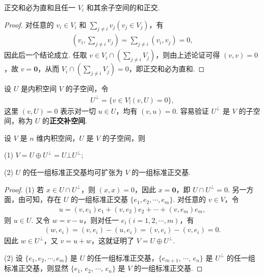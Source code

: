 \documentclass[../../main.tex]{subfiles}
\begin{document}
\begin{lemma}\label{lemma:正交和必为直和}
正交和必为直和且任一 $V_i$ 和其余子空间的和正交.
\end{lemma}
\begin{proof}
对任意的 $v_i \in V_i$ 和 $\sum_{j \neq i}v_j (v_j \in V_j)$，有
\begin{align*}
(v_i, \sum_{j \neq i}v_j) = \sum_{j \neq i}(v_i, v_j) = 0,
\end{align*}
因此后一个结论成立. 任取 $v \in V_i \cap (\sum_{j \neq i}V_j)$，则由上述论证可得 $(v, v) = 0$，故 $v = \mathbf{0}$，从而 $V_i \cap (\sum_{j \neq i}V_j) = 0$，即正交和必为直和.

\end{proof}

\begin{definition}[正交补空间]\label{definition:正交补空间}
设 $U$ 是内积空间 $V$ 的子空间，令
\begin{align*}
U^\perp = \{v \in V | (v, U) = 0\},
\end{align*}
这里 $(v, U) = 0$ 表示对一切 $u \in U$，均有 $(v, u) = 0$. 容易验证 $U^\perp$ 是 $V$ 的子空间，称为 $U$ 的\textbf{正交补空间}.
\end{definition}

\begin{theorem}
设 $V$ 是 $n$ 维内积空间，$U$ 是 $V$ 的子空间，则

(1) $V = U \oplus U^\perp=U\bot U^{\bot}$;

(2) $U$ 的任一组标准正交基均可扩张为 $V$ 的一组标准正交基.
\end{theorem}
\begin{proof}
(1) 若 $x \in U \cap U^\perp$，则 $(x, x) = 0$，因此 $x = \mathbf{0}$，即 $U \cap U^\perp = 0$. 另一方面，由可知，存在 $U$ 的一组标准正交基 $\{e_1, e_2, \cdots, e_m\}$. 对任意的 $v \in V$，令
\begin{align*}
u = (v, e_1)e_1 + (v, e_2)e_2 + \cdots + (v, e_m)e_m,
\end{align*}
则 $u \in U$. 又令 $w = v - u$，则对任一 $e_i (i = 1, 2, \cdots, m)$，有
\begin{align*}
(w, e_i) = (v, e_i) - (u, e_i) = (v, e_i) - (v, e_i) = 0.
\end{align*}
因此 $w \in U^\perp$，又 $v = u + w$，这就证明了 $V = U \oplus U^\perp$.

(2) 设 $\{e_1, e_2, \cdots, e_m\}$ 是 $U$ 的任一组标准正交基，$\{e_{m + 1}$, $\cdots$, $e_n\}$ 是 $U^\perp$ 的任一组标准正交基，则显然 $\{e_1$, $e_2$, $\cdots$, $e_n\}$ 是 $V$ 的一组标准正交基. 

\end{proof}
\end{document}
